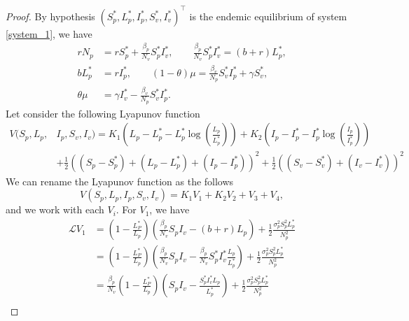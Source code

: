 \begin{proof}
	By hypothesis 
	$
		(S_p^*, L_p^*, I_p^*, S_v^*, I_v^*) ^ \top
	$ is the endemic equilibrium of system \eqref{system_1}, we have
	\begin{equation}
		\begin{aligned}
			rN_p
				&=
					rS_p^* + 
					\frac{\beta_p}{N_v}S_p^*I_v^*,
					\quad\quad 
					\frac{\beta_p}{N_v}S_p^*I_v^* = (b+r)L_p^*,
			\\
			bL_p^*
				&=
					rI_p^*, 
					\quad\quad 
					(1-\theta)
					\mu = \frac{\beta_v}{N_p}S_v^*I_p^*+\gamma S_v^*,
			\\
					\theta\mu &= 
					\gamma I_v^* -\frac{\beta_v}{N_p}S_v^*I_p^*.
		\end{aligned}
	\end{equation}
	Let consider the following Lyapunov function
	\begin{align*}
		V(S_p,L_p,&I_p,S_v,I_v) = 
				K_1
				\left(
					L_p - L_p^* - 
					L_p^*\log
					\left(
						\frac{L_p}{L_p^*}
					\right)
				\right) + 
				 K_2
				\left(
				 	I_p - I_p^* - I_p^ * 
				 	\log
					\left(
						\frac{I_p}{I_p^*}
				 	\right)
				\right)
			\\
				&+
				\frac{1}{2}
				\left(
					(S_p - S_p^*) + 
					(L_p - L_p^*) + 
					(I_p - I_p^*)
				\right)^2 + 
				\frac{1}{2}
				\left(
					(S_v - S_v^*) + 
					(I_v - I_v^*)
				\right)^2		
	\end{align*}
	We can rename the Lyapunov function as the follows
	\begin{equation}
		V(S_p,L_p,I_p,S_v,I_v)= K_1V_1+K_2V_2+V_3+V_4,
	\end{equation}
%
	and we work with each $V_i$. For $V_1$, we have
	\begin{align*}
		\mathcal{L} V_1 
			&= 
				\left(
					1 - 
					\frac{L_P^*}{L_p}
				\right)
				\left(
					\frac{\beta_p}{N_v}S_pI_v - 
					(b+r) L_p
				\right) + 
				\frac{1}{2}
				\frac{\sigma_p^2S_p^2L_p^*}{N_p^2}
			\\
			&=
				\left(
					1 - \frac{L_P^*}{L_p}
				\right)
				\left(
					\frac{\beta_p}{N_v} S_pI_v - 
					\frac{\beta_p}{N_v} S_p ^* I_v ^* 
					\frac{L_p}{L_p^*}
				\right) + 
				\frac{1}{2}
				\frac{\sigma_p^2S_p^2L_p^*}{N_p^2}
			\\
			&=
				\frac{\beta_p}{N_v}
				\left(
					1 - 
					\frac{L_P^*}{L_p}
				\right)
				\left(S_pI_v - 
					\frac{S_p^*I_v^*L_p}{L_p^*}
				\right) + 
				\frac{1}{2}
				\frac{\sigma_p^2S_p^2L_p^*}{N_p^2}
			\\

\end{align*}
\end{proof}

